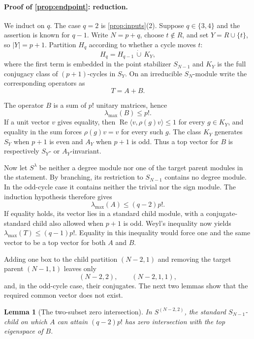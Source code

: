 \documentclass[11pt]{article}
\newtheorem{lemma}[theorem]{Lemma}
\theoremstyle{definition}
\newcommand{\lmax}{\lambda_{\max}}
\begin{document}
\paragraph{Proof of \cref{prop:endpoint}: reduction.}
We induct on $q$.  The case $q=2$ is
\cref{prop:inputs}(2).  Suppose $q\in\{3,4\}$ and the assertion is known for
$q-1$.  Write $N=p+q$, choose $t\notin R$, and set
$Y=R\cup\{t\}$, so $|Y|=p+1$.  Partition $H_q$ according to whether a
cycle moves $t$:
\[
 H_q=H_{q-1}\,\dot\cup\,K_Y,
 \tag{4.3}
\]
where the first term is embedded in the point stabilizer $S_{N-1}$ and
$K_Y$ is the full conjugacy class of $(p+1)$-cycles in $S_Y$.  On an
irreducible $S_N$-module write the corresponding operators as
\[
 T=A+B.
\]

The operator $B$ is a sum of $p!$ unitary matrices, hence
\[
 \lmax(B)\leq p!.
 \tag{4.4}
\]
If a unit vector $v$ gives equality, then
$\operatorname{Re}\langle v,\rho(g)v\rangle\leq1$ for every $g\in K_Y$,
and equality in the sum forces $\rho(g)v=v$ for every such $g$.  The class
$K_Y$ generates $S_Y$ when $p+1$ is even and $A_Y$ when $p+1$ is odd.
Thus a top vector for $B$ is respectively $S_Y$- or $A_Y$-invariant.

Now let $S^\lambda$ be neither a degree module nor one of the target parent
modules in the statement.  By branching, its restriction to $S_{N-1}$
contains no degree module.  In the odd-cycle case it contains neither the
trivial nor the sign module.  The induction hypothesis therefore gives
\[
 \lmax(A)\leq(q-2)p!.
 \tag{4.5}
\]
If equality holds, its vector lies in a standard child module, with a
conjugate-standard child also allowed when $p+1$ is odd.  Weyl's inequality
now yields $\lmax(T)\leq(q-1)p!$.  Equality in this inequality would force
one and the same vector to be a top vector for both $A$ and $B$.

Adding one box to the child partition $(N-2,1)$ and removing the target
parent $(N-1,1)$ leaves only
\[
 (N-2,2),\qquad (N-2,1,1),
 \tag{4.6}
\]
and, in the odd-cycle case, their conjugates.  The next two lemmas show that
the required common vector does not exist.

\begin{lemma}[The two-subset zero intersection]\label{lem:twosubset}
In $S^{(N-2,2)}$, the standard $S_{N-1}$-child on which $A$ can attain
$(q-2)p!$ has zero intersection with the top eigenspace of $B$.
\end{lemma}
\end{document}
